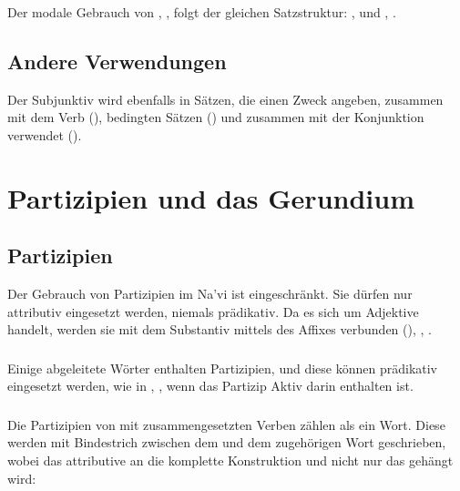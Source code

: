 \subsubsection{} Der modale Gebrauch von , , folgt der gleichen
Satzstruktur: ,  und ,
.

\subsection{Andere Verwendungen} Der Subjunktiv wird ebenfalls in S\"atzen, die einen Zweck
angeben, zusammen mit dem Verb  (), bedingten S\"atzen
() und zusammen mit der Konjunktion  verwendet
 ().


\section{Partizipien und das Gerundium}

\subsection{Partizipien} Der Gebrauch von Partizipien im Na’vi ist eingeschr\"ankt. Sie
d\"urfen nur attributiv eingesetzt werden, niemals pr\"adikativ. Da es sich um Adjektive
handelt, werden sie mit dem Substantiv mittels des Affixes  verbunden
(),
, .\label{syn:part:attr}

\subsubsection{} Einige abgeleitete W\"orter enthalten Partizipien, und diese k\"onnen
pr\"adikativ eingesetzt werden, wie in , ,
wenn das Partizip Aktiv  darin enthalten ist.

\subsubsection{} Die Partizipien von mit  zusammengesetzten Verben z\"ahlen als
ein Wort. Diese werden mit Bindestrich zwischen dem  und dem zugeh\"origen Wort
geschrieben, wobei das attributive  an die komplette Konstruktion und nicht nur
das  geh\"angt wird:\label{syn:participle:si-const}

